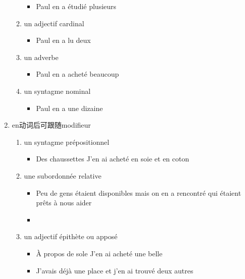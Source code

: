 \documentclass[UTF8]{report}
\begin{document}
\begin{enumerate}
\begin{enumerate}
\begin{itemize}
            \item Paul en a étudié plusieurs
        \end{itemize}
        \item un adjectif cardinal
        \begin{itemize}
            \item Paul en a lu deux
        \end{itemize}
        \item un adverbe
        \begin{itemize}
            \item Paul en a acheté beaucoup
        \end{itemize}
        \item un syntagme nominal
        \begin{itemize}
            \item Paul en a une dizaine
        \end{itemize}
    \end{enumerate}
    \item en动词后可跟随modifieur
    \begin{enumerate}
        \item un syntagme prépositionnel
        \begin{itemize}
            \item Des chaussettes J’en ai acheté en soie et en coton
        \end{itemize}
        \item une subordonnée relative
        \begin{itemize}
            \item Peu de gens étaient disponibles mais on en a rencontré qui étaient prêts à nous aider
            \item 
        \end{itemize}
        \item un adjectif épithète  ou apposé
        \begin{itemize}
            \item À propos de sole J’en ai acheté une belle
            \item J’avais déjà une place et j’en ai trouvé deux autres
        \end{itemize}
    \end{enumerate}
\end{enumerate}
\end{document}
